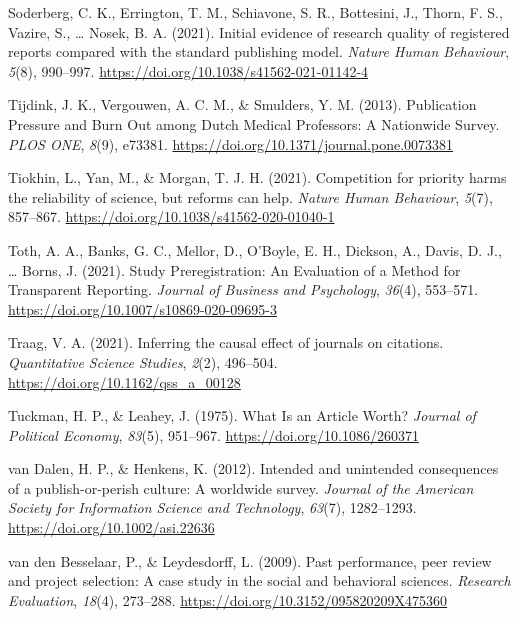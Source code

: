 \documentclass[
  british,
  a4paper,
  ,man,floatsintext]{apa6}
\newlength{\cslhangindent}
\newenvironment{CSLReferences}[2] %
 {\begin{list}{}{%
  \setlength{\itemindent}{0pt}
  \setlength{\leftmargin}{0pt}
  \setlength{\parsep}{0pt}
  \ifodd #1
   \setlength{\leftmargin}{\cslhangindent}
   \setlength{\itemindent}{-1\cslhangindent}
  \fi
  \setlength{\itemsep}{#2\baselineskip}}}
 {\end{list}}
\begin{document}
\begin{CSLReferences}{1}{0}
Soderberg, C. K., Errington, T. M., Schiavone, S. R., Bottesini, J., Thorn, F. S., Vazire, S., \ldots{} Nosek, B. A. (2021). Initial evidence of research quality of registered reports compared with the standard publishing model. \emph{Nature Human Behaviour}, \emph{5}(8), 990--997. \url{https://doi.org/10.1038/s41562-021-01142-4}

Tijdink, J. K., Vergouwen, A. C. M., \& Smulders, Y. M. (2013). Publication {Pressure} and {Burn Out} among {Dutch Medical Professors}: {A Nationwide Survey}. \emph{PLOS ONE}, \emph{8}(9), e73381. \url{https://doi.org/10.1371/journal.pone.0073381}

Tiokhin, L., Yan, M., \& Morgan, T. J. H. (2021). Competition for priority harms the reliability of science, but reforms can help. \emph{Nature Human Behaviour}, \emph{5}(7), 857--867. \url{https://doi.org/10.1038/s41562-020-01040-1}

Toth, A. A., Banks, G. C., Mellor, D., O'Boyle, E. H., Dickson, A., Davis, D. J., \ldots{} Borns, J. (2021). Study {Preregistration}: {An Evaluation} of a {Method} for {Transparent Reporting}. \emph{Journal of Business and Psychology}, \emph{36}(4), 553--571. \url{https://doi.org/10.1007/s10869-020-09695-3}

Traag, V. A. (2021). Inferring the causal effect of journals on citations. \emph{Quantitative Science Studies}, \emph{2}(2), 496--504. \url{https://doi.org/10.1162/qss_a_00128}

Tuckman, H. P., \& Leahey, J. (1975). What {Is} an {Article Worth}? \emph{Journal of Political Economy}, \emph{83}(5), 951--967. \url{https://doi.org/10.1086/260371}

van Dalen, H. P., \& Henkens, K. (2012). Intended and unintended consequences of a publish-or-perish culture: {A} worldwide survey. \emph{Journal of the American Society for Information Science and Technology}, \emph{63}(7), 1282--1293. \url{https://doi.org/10.1002/asi.22636}

van den Besselaar, P., \& Leydesdorff, L. (2009). Past performance, peer review and project selection: A case study in the social and behavioral sciences. \emph{Research Evaluation}, \emph{18}(4), 273--288. \url{https://doi.org/10.3152/095820209X475360}


\end{CSLReferences}
\end{document}
